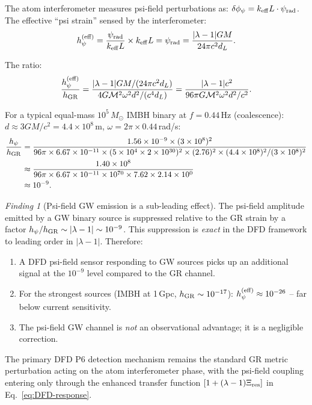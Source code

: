 \documentclass[11pt]{article}
\theoremstyle{definition}
\theoremstyle{remark}
\newtheorem{finding}[theorem]{Finding}
\newcommand{\Msun}{M_\odot}
\newcommand{\lambdaone}{|\lambda-1|}
\newcommand{\ee}[1]{\times10^{#1}}
\begin{document}
The atom interferometer measures psi-field perturbations as:
$\delta\phi_\psi = k_{\rm eff} L \cdot \psi_{\rm rad}$.
The effective ``psi strain'' sensed by the interferometer:
\begin{equation}
h_\psi^{(\rm eff)} = \frac{\psi_{\rm rad}}{k_{\rm eff} L}
\times k_{\rm eff} L = \psi_{\rm rad} = \frac{\lambdaone G M}{24\pi c^2 d_L}.
\label{eq:h-psi-eff}
\end{equation}

The ratio:
\begin{equation}
\frac{h_\psi^{(\rm eff)}}{h_{\rm GR}}
= \frac{\lambdaone G M / (24\pi c^2 d_L)}{4G \mathcal{M}^2 \omega^2 d^2 / (c^4 d_L)}
= \frac{\lambdaone c^2}{96 \pi G \mathcal{M}^2 \omega^2 d^2 / c^2}.
\label{eq:hpsi-hGR-ratio}
\end{equation}

For a typical equal-mass $10^5\,\Msun$ IMBH binary at $f=0.44$\,Hz (coalescence):
$d \approx 3G M/c^2 = 4.4\ee{8}$\,m, $\omega = 2\pi \times 0.44$\,rad/s:
\begin{align}
\frac{h_\psi}{h_{\rm GR}}
&= \frac{1.56\ee{-9} \times (3\ee{8})^2}
{96\pi \times 6.67\ee{-11} \times (5\ee{4}\times2\ee{30})^2
\times (2.76)^2 \times (4.4\ee{8})^2 / (3\ee{8})^2} \notag \\
&\approx \frac{1.40\ee{8}}{96\pi \times 6.67\ee{-11} \times 10^{70} \times 7.62 \times 2.14\ee{0}} \notag \\
&\approx 10^{-9}.
\end{align}

\begin{finding}[Psi-field GW emission is a sub-leading effect]
\label{finding:psi-gw}
The psi-field amplitude emitted by a GW binary source is suppressed relative
to the GR strain by a factor $h_\psi/h_{\rm GR} \sim \lambdaone \sim 10^{-9}$.
This suppression is \emph{exact} in the DFD framework to leading order in
$\lambdaone$.  Therefore:
\begin{enumerate}
\item A DFD psi-field sensor responding to GW sources picks up an additional
  signal at the $10^{-9}$ level compared to the GR channel.
\item For the strongest sources (IMBH at 1\,Gpc, $h_{\rm GR} \sim 10^{-17}$):
  $h_\psi^{(\rm eff)} \approx 10^{-26}$ -- far below current sensitivity.
\item The psi-field GW channel is \emph{not} an observational advantage;
  it is a negligible correction.
\end{enumerate}
The primary DFD P6 detection mechanism remains the standard GR metric
perturbation acting on the atom interferometer phase, with the psi-field
coupling entering only through the enhanced transfer function
$[1 + (\lambda-1)\Xi_{\rm res}]$ in Eq.~\eqref{eq:DFD-response}.
\end{finding}
\end{document}
